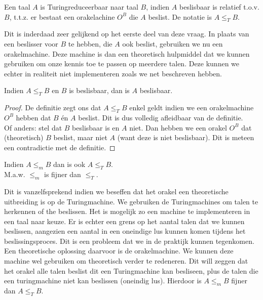 \begin{theorem}[Turingreduceerbaar]
	Een taal $A$ is Turingreduceerbaar naar taal $B$, indien $A$ beslisbaar is relatief t.o.v. $B$, t.t.z. er bestaat een orakelachine $O^B$ die $A$ beslist. De notatie is $A \leq_T B$.
\end{theorem}

Dit is inderdaad zeer gelijkend op het eerste deel van deze vraag. In plaats van een beslisser voor $B$ te hebben, die $A$ ook beslist, gebruiken we nu een orakelmachine. Deze machine is dan een theoretisch hulpmiddel dat we kunnen gebruiken om onze kennis toe te passen op meerdere talen. Deze kunnen we echter in realiteit niet implementeren zoals we net beschreven hebben.

\begin{theorem}
	Indien $A \leq_T B$ en $B$ is beslisbaar, dan is $A$ beslisbaar.
\end{theorem}

\begin{proof}
	De definitie zegt ons dat $A \leq_T B$ enkel geldt indien we een orakelmachine $O^B$ hebben dat $B$ \'en $A$ beslist. Dit is dus volledig afleidbaar van de definitie.\\
	Of anders: stel dat $B$ beslisbaar is en $A$ niet. Dan hebben we een orakel $O^B$ dat (theoretisch) $B$ beslist, maar niet $A$ (want deze is niet beslisbaar). Dit is meteen een contradictie met de definitie.
\end{proof}

\begin{theorem}
	Indien $A \leq_m B$ dan is ook $A \leq_T B$.\\
	M.a.w. $\leq_m$ is fijner dan $\leq_T$.
\end{theorem}

Dit is vanzelfsprekend indien we beseffen dat het orakel een theoretische uitbreiding is op de Turingmachine. We gebruiken de Turingmachines om talen te herkennen of the beslissen. Het is mogelijk zo een machine te implementeren in een taal naar keuze. Er is echter een grens op het aantal talen dat we kunnen beslissen, aangezien een aantal in een oneindige lus kunnen komen tijdens het beslissingsproces. Dit is een probleem dat we in de praktijk kunnen tegenkomen. Een theoretische oplossing daarvoor is de orakelmachine. We kunnen deze machine wel gebruiken om theoretisch verder te redeneren. Dit will zeggen dat het orakel alle talen beslist dit een Turingmachine kan besliseen, plus de talen die een turingmachine niet kan beslissen (oneindig lus). Hierdoor is $A \leq_m B$ fijner dan $A \leq_T B$.